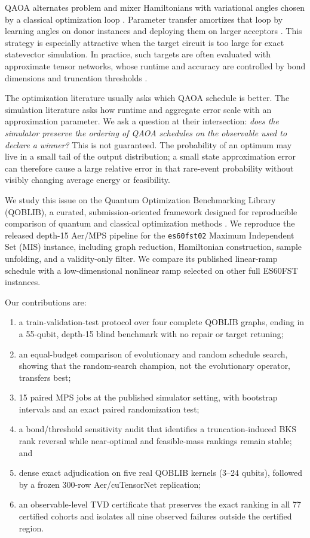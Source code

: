 \documentclass[10pt,twocolumn]{article}
\begin{document}
QAOA alternates problem and mixer Hamiltonians with variational angles chosen
by a classical optimization loop \cite{farhi}. Parameter transfer amortizes
that loop by learning angles on donor instances and deploying them on larger
acceptors \cite{galda,montanez}. This strategy is especially attractive when
the target circuit is too large for exact statevector simulation. In practice,
such targets are often evaluated with approximate tensor networks, whose
runtime and accuracy are controlled by bond dimensions and truncation
thresholds \cite{mpsreview,zerosetup}.

The optimization literature usually asks which QAOA schedule is better. The
simulation literature asks how runtime and aggregate error scale with an
approximation parameter. We ask a question at their intersection:
\emph{does the simulator preserve the ordering of QAOA schedules on the
observable used to declare a winner?} This is not guaranteed. The probability
of an optimum may live in a small tail of the output distribution; a small
state approximation error can therefore cause a large relative error in that
rare-event probability without visibly changing average energy or feasibility.

We study this issue on the Quantum Optimization Benchmarking Library (QOBLIB),
a curated, submission-oriented framework designed for reproducible comparison
of quantum and classical optimization methods \cite{qoblib}. We reproduce the
released depth-15 Aer/MPS pipeline for the \texttt{es60fst02} Maximum
Independent Set (MIS) instance, including graph reduction, Hamiltonian
construction, sample unfolding, and a validity-only filter. We compare its
published linear-ramp schedule with a low-dimensional nonlinear ramp selected
on other full ES60FST instances.

Our contributions are:
\begin{enumerate}[leftmargin=*,nosep]
  \item a train-validation-test protocol over four complete QOBLIB graphs,
  ending in a 55-qubit, depth-15 blind benchmark with no repair or target
  retuning;
  \item an equal-budget comparison of evolutionary and random schedule search,
  showing that the random-search champion, not the evolutionary operator,
  transfers best;
  \item 15 paired MPS jobs at the published simulator setting, with bootstrap
  intervals and an exact paired randomization test;
  \item a bond/threshold sensitivity audit that identifies a truncation-induced
  BKS rank reversal while near-optimal and feasible-mass rankings remain stable;
  and
  \item dense exact adjudication on five real QOBLIB kernels (3--24 qubits),
  followed by a frozen 300-row Aer/cuTensorNet replication;
  \item an observable-level TVD certificate that preserves the exact ranking in
  all 77 certified cohorts and isolates all nine observed failures outside the
  certified region.
\end{enumerate}
\end{document}
